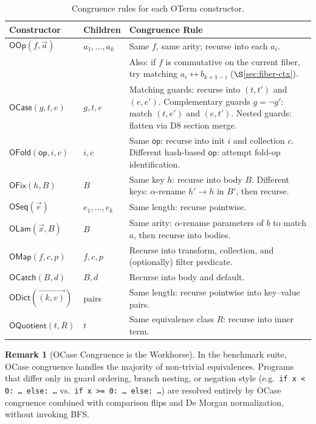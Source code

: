 \documentclass[11pt,a4paper]{report}
\theoremstyle{definition}
\newtheorem{remark}[definition]{Remark}
\theoremstyle{plain}
\begin{document}
\begin{table}[h]
\centering
\small
\caption{Congruence rules for each OTerm constructor.}
\label{tab:congruence-rules}
\begin{tabular}{l l p{6cm}}
\toprule
\textbf{Constructor} & \textbf{Children} & \textbf{Congruence Rule} \\
\midrule
$\mathsf{OOp}(f, \vec a)$ & $a_1, \ldots, a_k$ &
  Same $f$, same arity; recurse into each $a_i$. \\
  & & Also: if $f$ is commutative on the current fiber,
  try matching $a_i \leftrightarrow b_{k+1-i}$
  ($\S$\ref{sec:fiber-ctx}). \\
$\mathsf{OCase}(g, t, e)$ & $g, t, e$ &
  Matching guards: recurse into $(t, t')$ and $(e, e')$.
  Complementary guards $g = \lnot g'$: match $(t, e')$
  and $(e, t')$.
  Nested guards: flatten via D8 section merge. \\
$\mathsf{OFold}(\mathsf{op}, i, c)$ & $i, c$ &
  Same $\mathsf{op}$: recurse into init $i$ and collection $c$.
  Different hash-based $\mathsf{op}$: attempt fold-op
  identification. \\
$\mathsf{OFix}(h, B)$ & $B$ &
  Same key $h$: recurse into body $B$.
  Different keys: $\alpha$-rename $h' \to h$ in $B'$,
  then recurse. \\
$\mathsf{OSeq}(\vec e)$ & $e_1, \ldots, e_k$ &
  Same length: recurse pointwise. \\
$\mathsf{OLam}(\vec x, B)$ & $B$ &
  Same arity: $\alpha$-rename parameters of $b$ to match
  $a$, then recurse into bodies. \\
$\mathsf{OMap}(f, c, p)$ & $f, c, p$ &
  Recurse into transform, collection, and (optionally)
  filter predicate. \\
$\mathsf{OCatch}(B, d)$ & $B, d$ &
  Recurse into body and default. \\
$\mathsf{ODict}(\vec{(k,v)})$ & pairs &
  Same length: recurse pointwise into key--value pairs. \\
$\mathsf{OQuotient}(t, R)$ & $t$ &
  Same equivalence class $R$: recurse into inner term. \\
\bottomrule
\end{tabular}
\end{table}

\begin{remark}[OCase Congruence is the Workhorse]
In the benchmark suite, OCase congruence handles the majority of
non-trivial equivalences.  Programs that differ only in guard
ordering, branch nesting, or negation style (e.g.\
\texttt{if x < 0: \ldots\ else: \ldots} vs.\
\texttt{if x >= 0: \ldots\ else: \ldots}) are resolved entirely
by OCase congruence combined with comparison flips and De Morgan
normalization, without invoking BFS.
\end{remark}
\end{document}
